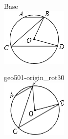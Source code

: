 \documentclass[12pt]{article}
\begin{document}
\begin{center}
\begin{minipage}{0.32\textwidth}\centering
Base\\
\includegraphics[width=0.95\linewidth]{out_rommath_origin/items/geo501-origin/assets/figure.png}
\end{minipage}
\hfill\begin{minipage}{0.32\textwidth}\centering
geo501-origin\_rot30\\
\includegraphics[width=0.95\linewidth]{out_rommath_origin/items/geo501-origin/assets/figure_rot30.png}

\end{minipage}
\end{center}
\end{document}
